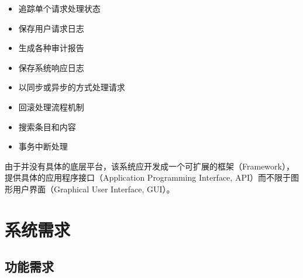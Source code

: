 \documentclass[cs4size,a4paper,nofonts]{ctexart}
\begin{document}
\begin{itemize}
\item 追踪单个请求处理状态
\item 保存用户请求日志
\item 生成各种审计报告
\item 保存系统响应日志
\item 以同步或异步的方式处理请求
\item 回滚处理流程机制
\item 搜索条目和内容
\item 事务中断处理
\end{itemize}

由于并没有具体的底层平台，该系统应开发成一个可扩展的框架（Framework），提供具体的应用程序接口（Application Programming Interface, API）而不限于图形用户界面（Graphical User Interface, GUI）。





\section{系统需求}

\subsection{功能需求}
\end{document}
